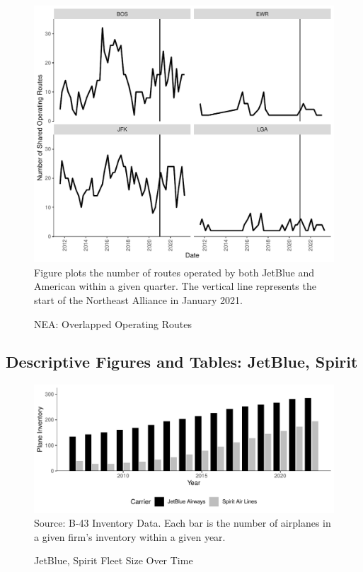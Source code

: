 \documentclass{article}
\begin{document}
\begin{appendices}
    \begin{figure}[h]
        \caption{NEA: Overlapped Operating Routes}
        \label{fig:NEA_Operating}
        \includegraphics[width = \linewidth]{05.Figures/NEA_Operating_Graph.pdf}
        \footnotesize{Figure plots the number of routes operated by both JetBlue and American within a given quarter. The vertical line represents the start of the Northeast Alliance in January 2021.}
    \end{figure}

    \FloatBarrier\pagebreak

	\subsection{Descriptive Figures and Tables: JetBlue, Spirit}
	\begin{figure}[h]
	\caption{JetBlue, Spirit Fleet Size Over Time}
	\label{fig:Both_fleet}
	\includegraphics[width = \linewidth]{Both_Planes.pdf}
	\footnotesize{Source: B-43 Inventory Data. Each bar is the number of airplanes in a given firm's inventory within a given year.}
\end{figure}


\end{appendices}
\end{document}
